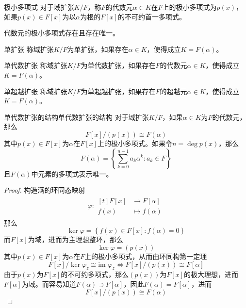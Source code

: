 \documentclass[lang = cn, scheme = chinese, thmcnt = section]{elegantbook}
\begin{document}
\begin{definition}{极小多项式}
	对于域扩张$K/F$，称$F$的代数元$\alpha\in K$在$F$上的极小多项式为$p(x)$，如果$p(x)\in F[x]$为以$\alpha$为根的$F[x]$的不可约首一多项式。
\end{definition}

\begin{theorem}
	代数元的极小多项式存在且存在唯一。
\end{theorem}

\begin{definition}{单扩张}
	称域扩张$K/F$为单扩张，如果存在$\alpha\in K$，使得成立$K=F(\alpha)$。
\end{definition}

\begin{definition}{单代数扩张}
	称域扩张$K/F$为单代数扩张，如果存在$F$的代数元$\alpha\in K$，使得成立$K=F(\alpha)$。
\end{definition}

\begin{definition}{单超越扩张}
	称域扩张$K/F$为单超越扩张，如果存在$F$的超越元$\alpha\in K$，使得成立$K=F(\alpha)$。
\end{definition}

\begin{theorem}{单代数扩张的结构}{单代数扩张的结构}
	对于域扩张$K/F$，如果$\alpha\in K$为$F$的代数元，那么
	$$
	F[x]/(p(x))\cong F(\alpha)
	$$
	其中$p(x)\in F[x]$为$\alpha$在$F[x]$上的极小多项式。如果令$n=\deg p(x)$，那么
	$$
	F(\alpha)=\left\{ \sum_{k=0}^{n-1}a_k\alpha^k:a_k\in F \right\}
	$$
	且$F(\alpha)$中元素的多项式表示唯一。
\end{theorem}

\begin{proof}
	构造满的环同态映射
	\begin{align*}
		\varphi:\begin{aligned}[t]
			F[x]&\longrightarrow F[\alpha]\\
			f(x)&\longmapsto f(\alpha)
		\end{aligned}
	\end{align*}
	那么
	$$
	\ker\varphi=\left\{ f(x)\in F[x]:f(\alpha)=0 \right\}
	$$
	而$F[x]$为域，进而为主理想整环，那么
	$$
	\ker\varphi=(p(x))
	$$
	其中$p(x)\in F[x]$为$\alpha$在$F$上的极小多项式，从而由环同构第一定理
	$$
	F[x]/\ker\varphi_z\cong\text{im }\varphi_z\iff 
	F[x]/(p(x))\cong  F[\alpha]
	$$
	由于$p(x)$为$F[x]$的不可约多项式，那么$(p(x))$为$F[x]$的极大理想，进而$F[\alpha]$为域。而容易知道$F(\alpha)\supset F[\alpha]$，因此$F(\alpha)=F[\alpha]$，进而
	$$
	F[x]/(p(x))\cong F(\alpha)
	$$
\end{proof}
\end{document}
